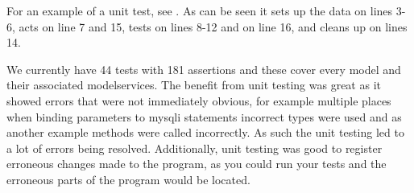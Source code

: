 For an example of a unit test, see .
As can be seen it sets up the data on lines 3-6, acts on line 7 and 15, tests on lines 8-12 and on line 16, and cleans up on lines 14.

We currently have 44 tests with 181 assertions and these cover every model and their associated modelservices. 
The benefit from unit testing was great as it showed errors that were not immediately obvious, for example multiple places when binding parameters to mysqli statements incorrect types were used and as another example methods were called incorrectly.
As such the unit testing led to a lot of errors being resolved.
Additionally, unit testing was good to register erroneous changes made to the program, as you could run your tests and the erroneous parts of the program would be located.